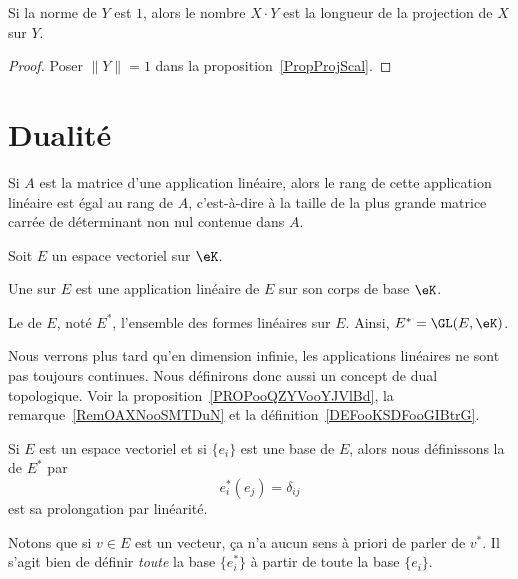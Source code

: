 \begin{corollary}
	Si la norme de $Y$ est $1$, alors le nombre $X\cdot Y$ est la longueur de la projection de $X$ sur $Y$.
\end{corollary}

\begin{proof}
	Poser $\| Y \|=1$ dans la proposition~\ref{PropProjScal}.
\end{proof}

\section{Dualité}

\begin{proposition} \label{PropEJBZooTNFPRj}
    Si \( A\) est la matrice d'une application linéaire, alors le rang de cette application linéaire est égal au rang de \( A \), c'est-à-dire à la taille de la plus grande matrice carrée de déterminant non nul contenue dans \( A\).
\end{proposition}

\begin{definition}  \label{DefJPGSHpn}
    Soit \( E\) un espace vectoriel sur \( \eK\).

    Une  sur \( E \) est une application linéaire de \( E \) sur son corps de base \( \eK\).

    Le  de \( E\), noté \( E^*\), l'ensemble des formes linéaires sur \( E\). Ainsi, \( E^* = \GL(E,\eK)\).
\end{definition}

Nous verrons plus tard qu'en dimension infinie, les applications linéaires ne sont pas toujours continues. Nous définirons donc aussi un concept de dual topologique. Voir la proposition~\ref{PROPooQZYVooYJVlBd}, la remarque~\ref{RemOAXNooSMTDuN} et la définition~\ref{DEFooKSDFooGIBtrG}.

\begin{definition}      \label{DEFooTMSEooZFtsqa}
    Si \( E\) est un espace vectoriel et si \( \{ e_i \}\) est une base de \( E\), alors nous définissons la  de \( E^*\) par
    \begin{equation}
        e_i^*(e_j)=\delta_{ij}
    \end{equation}
    est sa prolongation par linéarité.
\end{definition}
Notons que si \( v\in E\) est un vecteur, ça n'a aucun sens à priori de parler de \( v^*\). Il s'agit bien de définir \emph{toute} la base \( \{ e_i^* \}\) à partir de toute la base \( \{ e_i \}\).

